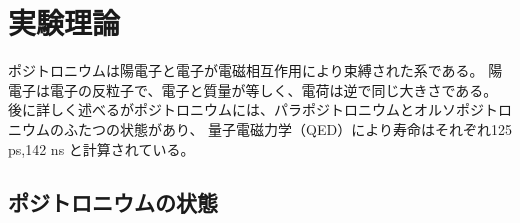 \chapter{実験理論}\label{theory}

\usepackage{amsmath}
\usepackage{float}
\usepackage{braket}
\usepackage{comment}
\usepackage[dvipdfmx, hiresbb]{graphicx}
\def\vector#1{\mbox{\boldmath $#1$}}
\renewcommand{\labelitemi}{・}
\makeatletter
\renewcommand{\thefigure}{\thesection.\arabic{figure}}
\renewcommand{\theequation}{\thesection.\arabic{equation}}
\makeatother

%

ポジトロニウムは陽電子と電子が電磁相互作用により束縛された系である。
陽電子は電子の反粒子で、電子と質量が等しく、電荷は逆で同じ大きさである。
後に詳しく述べるがポジトロニウムには、パラポジトロニウムとオルソポジトロニウムのふたつの状態があり、
量子電磁力学（QED）により寿命はそれぞれ125 ps,142 ns と計算されている。


\section{ポジトロニウムの状態}

